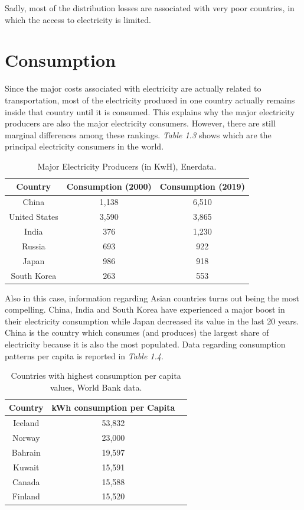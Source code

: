 \documentclass{book}
\begin{document}
Sadly, most of the distribution losses are associated with very poor countries, in which the access to electricity is limited. 

\section{Consumption}

Since the major costs associated with electricity are actually related to transportation, most of the electricity produced in one country actually remains inside that country until it is consumed. This explains why the major electricity producers are also the major electricity consumers. However, there are still marginal differences among these rankings. \textit{Table 1.3} shows which are the principal electricity consumers in the world.

\bigskip
\begin{table}[H]
\begin{center}
\begin{tabular}{|c|c|c|}
\hline
Country & Consumption (2000) & Consumption (2019)\\
\hline
China & 1,138 & 6,510\\
United States & 3,590 & 3,865\\
India & 376 & 1,230\\
Russia & 693 & 922\\
Japan & 986 & 918\\
South Korea & 263 & 553\\
\hline
\end{tabular}
\caption{Major Electricity Producers (in KwH), Enerdata.}
\end{center}
\end{table}

Also in this case, information regarding Asian countries turns out being the most compelling. China, India and South Korea have experienced a major boost in their electricity consumption while Japan decreased its value in the last 20 years. China is the country which consumes (and produces) the largest share of electricity because it is also the most populated. Data regarding consumption patterns per capita is reported in \textit{Table 1.4}.

\bigskip
\begin{table}[H]
\begin{center}
\begin{tabular}{|c|c|c|}
\hline
Country & kWh consumption per Capita\\
\hline
Iceland & 53,832\\
Norway & 23,000\\
Bahrain & 19,597\\
Kuwait & 15,591\\
Canada & 15,588\\
Finland & 15,520\\
\hline
\end{tabular}
\caption{Countries with highest consumption per capita values, World Bank data.}
\end{center}
\end{table}
\bigskip
\end{document}
